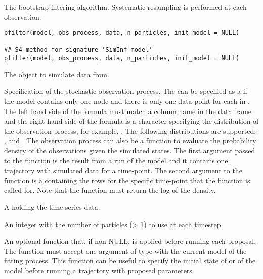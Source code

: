 \documentclass[letterpaper]{book}
\begin{document}
%
\begin{Description}
The bootstrap filtering algorithm. Systematic resampling is
performed at each observation.
\end{Description}
%
\begin{Usage}
\begin{verbatim}
pfilter(model, obs_process, data, n_particles, init_model = NULL)

## S4 method for signature 'SimInf_model'
pfilter(model, obs_process, data, n_particles, init_model = NULL)
\end{verbatim}
\end{Usage}
%
\begin{Arguments}
\begin{ldescription}
\item[\code{model}] The  object to simulate data from.

\item[\code{obs\_process}] Specification of the stochastic observation
process. The  can be specified as a
 if the model contains only one node and there
is only one data point for each  in .
The left hand side of the formula must match a column name in
the  data.frame and the right hand side of the
formula is a character specifying the distribution of the
observation process, for example, .
The following distributions are supported: ,  and . The observation process can also be a
function to evaluate the probability density of the
observations given the simulated states. The first argument
passed to the  function is the result from a
run of the model and it contains one trajectory with simulated
data for a time-point. The second argument to the
 function is a  containing
the rows for the specific time-point that the function is
called for. Note that the function must return the log of the
density.

\item[\code{data}] A  holding the time series data.

\item[\code{n\_particles}] An integer with the number of particles (> 1)
to use at each timestep.

\item[\code{init\_model}] An optional function that, if non-NULL, is
applied before running each proposal. The function must accept
one argument of type  with the current
model of the fitting process. This function can be useful to
specify the initial state of  or  of the
model before running a trajectory with proposed parameters.
\end{ldescription}
\end{Arguments}
\end{document}
